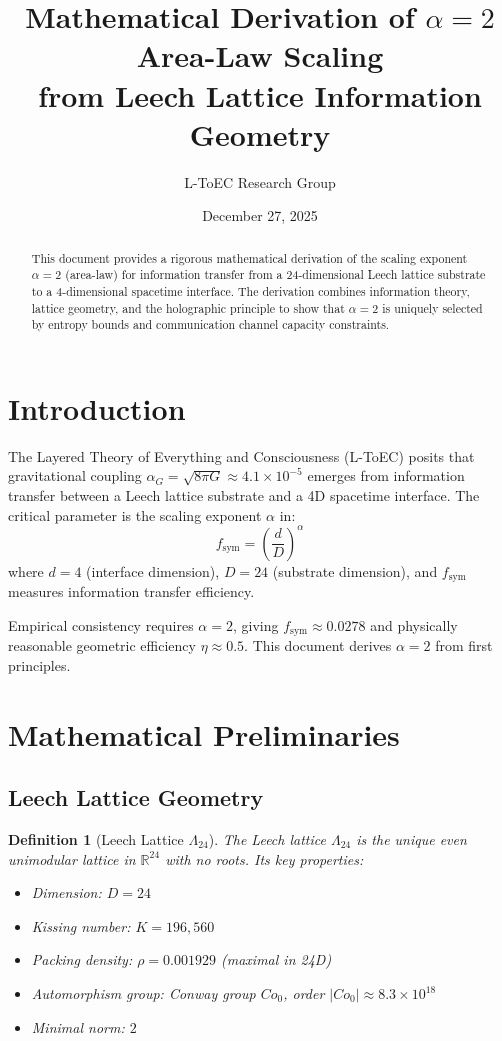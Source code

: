 \documentclass[11pt]{article}
\title{Mathematical Derivation of $\alpha=2$ Area-Law Scaling\\ from Leech Lattice Information Geometry}
\author{L-ToEC Research Group}
\date{December 27, 2025}
\newtheorem{definition}{Definition}
\begin{document}
\maketitle

\begin{abstract}
This document provides a rigorous mathematical derivation of the scaling exponent $\alpha=2$ (area-law) for information transfer from a 24-dimensional Leech lattice substrate to a 4-dimensional spacetime interface. The derivation combines information theory, lattice geometry, and the holographic principle to show that $\alpha=2$ is uniquely selected by entropy bounds and communication channel capacity constraints.
\end{abstract}

\section{Introduction}

The Layered Theory of Everything and Consciousness (L-ToEC) posits that gravitational coupling $\alpha_G = \sqrt{8\pi G} \approx 4.1\times10^{-5}$ emerges from information transfer between a Leech lattice substrate and a 4D spacetime interface. The critical parameter is the scaling exponent $\alpha$ in:
\[
f_{\text{sym}} = \left(\frac{d}{D}\right)^\alpha
\]
where $d=4$ (interface dimension), $D=24$ (substrate dimension), and $f_{\text{sym}}$ measures information transfer efficiency.

Empirical consistency requires $\alpha=2$, giving $f_{\text{sym}} \approx 0.0278$ and physically reasonable geometric efficiency $\eta \approx 0.5$. This document derives $\alpha=2$ from first principles.

\section{Mathematical Preliminaries}

\subsection{Leech Lattice Geometry}

\begin{definition}[Leech Lattice $\Lambda_{24}$]
The Leech lattice $\Lambda_{24}$ is the unique even unimodular lattice in $\mathbb{R}^{24}$ with no roots. Its key properties:
\begin{itemize}
\item Dimension: $D = 24$
\item Kissing number: $K = 196,\!560$
\item Packing density: $\rho = 0.001929$ (maximal in 24D)
\item Automorphism group: Conway group $Co_0$, order $|Co_0| \approx 8.3\times10^{18}$
\item Minimal norm: $2$
\end{itemize}
\end{definition}
\end{document}
